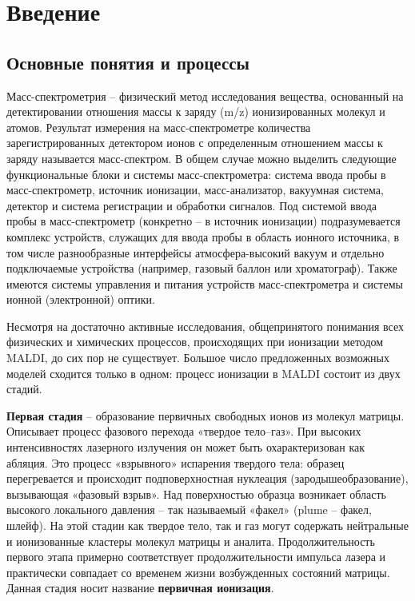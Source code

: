 \documentclass{article}
\begin{document}
\section{Введение}
\subsection{Основные понятия и процессы}\;
\par Масс-спектрометрия – физический метод исследования вещества, основанный на детектировании отношения массы к заряду (m/z) ионизированных молекул и атомов. Результат измерения на масс-спектрометре количества зарегистрированных детектором ионов с определенным отношением массы к заряду называется масс-спектром.
В общем случае можно выделить следующие функциональные блоки и системы масс-спектрометра: система ввода пробы в масс-спектрометр, источник ионизации, масс-анализатор, вакуумная система, детектор и система регистрации и обработки сигналов. Под системой ввода пробы в
масс-спектрометр (конкретно – в источник ионизации) подразумевается комплекс устройств, служащих для ввода пробы в область ионного источника, в том числе разнообразные интерфейсы атмосфера-высокий вакуум и отдельно подключаемые устройства (например, газовый
баллон или хроматограф). Также имеются системы управления и питания устройств масс-спектрометра и системы ионной (электронной) оптики.

Несмотря на достаточно активные исследования, общепринятого понимания всех физических и химических процессов, происходящих при ионизации методом MALDI, до сих пор не существует. Большое число предложенных возможных моделей сходится только в одном: процесс ионизации в MALDI состоит из двух стадий.


\textbf{Первая стадия} – образование первичных свободных ионов из молекул матрицы. Описывает процесс фазового перехода «твердое тело–газ». При высоких интенсивностях лазерного излучения он может быть охарактеризован как абляция. Это процесс «взрывного» испарения твердого тела: образец перегревается и происходит подповерхностная нуклеация (зародышеобразование), вызывающая «фазовый взрыв». Над поверхностью образца возникает область высокого локального давления – так называемый «факел» (plume – факел, шлейф). На этой стадии как твердое тело, так и газ могут содержать нейтральные и ионизованные кластеры молекул матрицы и аналита. Продолжительность первого этапа примерно соответствует продолжительности импульса лазера и практически совпадает со временем жизни возбужденных состояний матрицы. Данная стадия носит название \textbf{первичная ионизация}.
\end{document}
